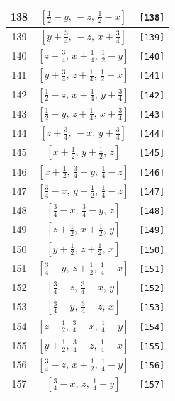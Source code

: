 \documentclass[fleqn,8pt]{jsarticle}
\begin{document}
\begin{longtable}{ccc}
138 & $\left[ \frac{1}{2} - y,\, - z,\, \frac{1}{2} - x \right]$ & {\tt [138]} \\ \hline
139 & $\left[ y + \frac{3}{4},\, - z,\, x + \frac{3}{4} \right]$ & {\tt [139]} \\ \hline
140 & $\left[ z + \frac{3}{4},\, x + \frac{1}{4},\, \frac{1}{2} - y \right]$ & {\tt [140]} \\ \hline
141 & $\left[ y + \frac{3}{4},\, z + \frac{1}{4},\, \frac{1}{2} - x \right]$ & {\tt [141]} \\ \hline
142 & $\left[ \frac{1}{2} - z,\, x + \frac{1}{4},\, y + \frac{3}{4} \right]$ & {\tt [142]} \\ \hline
143 & $\left[ \frac{1}{2} - y,\, z + \frac{1}{4},\, x + \frac{3}{4} \right]$ & {\tt [143]} \\ \hline
144 & $\left[ z + \frac{3}{4},\, - x,\, y + \frac{3}{4} \right]$ & {\tt [144]} \\ \hline
145 & $\left[ x + \frac{1}{2},\, y + \frac{1}{2},\, z \right]$ & {\tt [145]} \\ \hline
146 & $\left[ x + \frac{1}{2},\, \frac{3}{4} - y,\, \frac{1}{4} - z \right]$ & {\tt [146]} \\ \hline
147 & $\left[ \frac{3}{4} - x,\, y + \frac{1}{2},\, \frac{1}{4} - z \right]$ & {\tt [147]} \\ \hline
148 & $\left[ \frac{3}{4} - x,\, \frac{3}{4} - y,\, z \right]$ & {\tt [148]} \\ \hline
149 & $\left[ z + \frac{1}{2},\, x + \frac{1}{2},\, y \right]$ & {\tt [149]} \\ \hline
150 & $\left[ y + \frac{1}{2},\, z + \frac{1}{2},\, x \right]$ & {\tt [150]} \\ \hline
151 & $\left[ \frac{3}{4} - y,\, z + \frac{1}{2},\, \frac{1}{4} - x \right]$ & {\tt [151]} \\ \hline
152 & $\left[ \frac{3}{4} - z,\, \frac{3}{4} - x,\, y \right]$ & {\tt [152]} \\ \hline
153 & $\left[ \frac{3}{4} - y,\, \frac{3}{4} - z,\, x \right]$ & {\tt [153]} \\ \hline
154 & $\left[ z + \frac{1}{2},\, \frac{3}{4} - x,\, \frac{1}{4} - y \right]$ & {\tt [154]} \\ \hline
155 & $\left[ y + \frac{1}{2},\, \frac{3}{4} - z,\, \frac{1}{4} - x \right]$ & {\tt [155]} \\ \hline
156 & $\left[ \frac{3}{4} - z,\, x + \frac{1}{2},\, \frac{1}{4} - y \right]$ & {\tt [156]} \\ \hline
157 & $\left[ \frac{3}{4} - x,\, z,\, \frac{1}{4} - y \right]$ & {\tt [157]} \\ \hline

\end{longtable}
\end{document}
